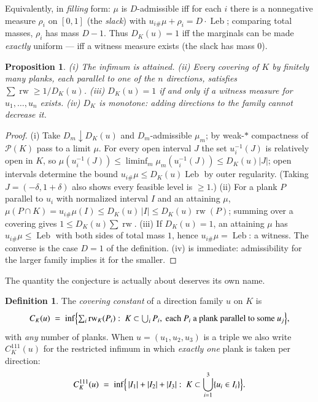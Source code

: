 \documentclass{aims}
\numberwithin{equation}{section}
\theoremstyle{plain}
\newtheorem{proposition}[theorem]{Proposition}
\theoremstyle{definition}
\newtheorem{definition}[theorem]{Definition}
\theoremstyle{remark}
\newcommand{\rw}{\operatorname{rw}}
\newcommand{\Leb}{\operatorname{Leb}}
\begin{document}
Equivalently, in \emph{filling} form: $\mu$ is $D$-admissible iff for each $i$
there is a nonnegative measure $\rho_i$ on $[0,1]$ (the \emph{slack}) with
$u_{i\#}\mu+\rho_i=D\cdot\Leb$; comparing total masses, $\rho_i$ has mass
$D-1$. Thus $D_K(u)=1$ iff the marginals can be made \emph{exactly} uniform ---
iff a witness measure exists (the slack has mass $0$).

\begin{proposition}\label{prop:defect}
(i) The infimum is attained. (ii) Every covering of $K$ by finitely many
planks, each parallel to one of the $n$ directions, satisfies
$\sum\rw\ge 1/D_K(u)$. (iii) $D_K(u)=1$ if and only if a witness measure for
$u_1,\dots,u_n$ exists. (iv) $D_K$ is monotone: adding directions to the
family cannot decrease it.
\end{proposition}

\begin{proof}
(i) Take $D_m\downarrow D_K(u)$ and $D_m$-admissible $\mu_m$; by weak-$*$
compactness of $\mathcal P(K)$ pass to a limit $\mu$. For every open interval
$J$ the set $u_i^{-1}(J)$ is relatively open in $K$, so
$\mu(u_i^{-1}(J))\le\liminf_m\mu_m(u_i^{-1}(J))\le D_K(u)|J|$; open intervals
determine the bound $u_{i\#}\mu\le D_K(u)\Leb$ by outer regularity. (Taking
$J=(-\delta,1+\delta)$ also shows every feasible level is $\ge1$.)
(ii) For a plank $P$ parallel to $u_i$ with normalized interval $I$ and an
attaining $\mu$,
$\mu(P\cap K)=u_{i\#}\mu(I)\le D_K(u)\,|I|\le D_K(u)\rw(P)$; summing over a
covering gives $1\le D_K(u)\sum\rw$.
(iii) If $D_K(u)=1$, an attaining $\mu$ has $u_{i\#}\mu\le\Leb$ with both sides
of total mass $1$, hence $u_{i\#}\mu=\Leb$: a witness. The converse is the case
$D=1$ of the definition. (iv) is immediate: admissibility for the larger family
implies it for the smaller.
\end{proof}

The quantity the conjecture is actually about deserves its own name.

\begin{definition}\label{def:covconst}
The \emph{covering constant} of a direction family $u$ on $K$ is
\[
C_K(u)\;=\;\inf\Bigl\{\textstyle\sum_i\rw_K(P_i):\ K\subset\bigcup_iP_i,\
\text{each }P_i\text{ a plank parallel to some }u_j\Bigr\},
\]
with \emph{any} number of planks. When $u=(u_1,u_2,u_3)$ is a triple we also
write $C^{111}_K(u)$ for the restricted infimum in which \emph{exactly one}
plank is taken per direction:
\[
C^{111}_K(u)\;=\;\inf\Bigl\{\,|I_1|+|I_2|+|I_3|:\ K\subset\bigcup_{i=1}^3
\{u_i\in I_i\}\Bigr\}.
\]
\end{definition}
\end{document}

